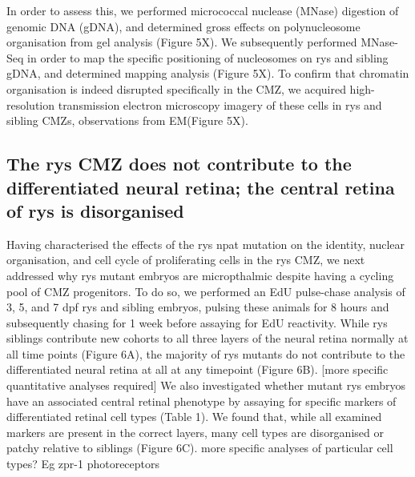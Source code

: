 In order to assess this, we performed micrococcal nuclease (MNase) digestion of genomic DNA (gDNA), and determined gross effects on polynucleosome organisation from gel analysis (Figure 5X). We subsequently performed MNase-Seq in order to map the specific positioning of nucleosomes on rys and sibling gDNA, and determined mapping analysis (Figure 5X). To confirm that chromatin organisation is indeed disrupted specifically in the CMZ, we acquired high-resolution transmission electron microscopy imagery of these cells in rys and sibling CMZs, observations from EM(Figure 5X).

\subsection{The rys CMZ does not contribute to the differentiated neural retina; the central retina of rys is disorganised}
Having characterised the effects of the rys npat mutation on the identity, nuclear organisation, and cell cycle of proliferating cells in the rys CMZ, we next addressed why rys mutant embryos are micropthalmic despite having a cycling pool of CMZ progenitors. To do so, we performed an EdU pulse-chase analysis of 3, 5, and 7 dpf rys and sibling embryos, pulsing these animals for 8 hours and subsequently chasing for 1 week before assaying for EdU reactivity. While rys siblings contribute new cohorts to all three layers of the neural retina normally at all time points (Figure 6A), the majority of rys mutants do not contribute to the differentiated neural retina at all at any timepoint (Figure 6B). [more specific quantitative analyses required] We also investigated whether mutant rys embryos have an associated central retinal phenotype by assaying for specific markers of differentiated retinal cell types (Table 1). We found that, while all examined markers are present in the correct layers, many cell types are disorganised or patchy relative to siblings (Figure 6C). more specific analyses of particular cell types? Eg zpr-1 photoreceptors

